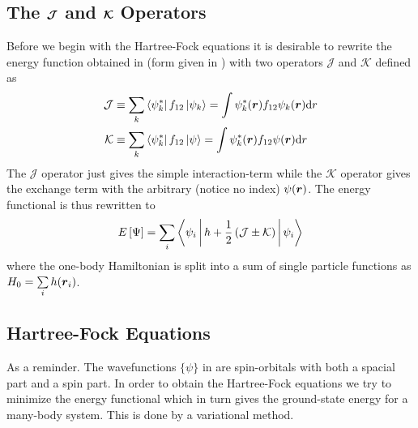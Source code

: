     \subsection{The $\boldsymbol{{\mathcal{J}}}$ and $\boldsymbol{{\mathcal{K}}}$ Operators}
        Before we begin with the Hartree-Fock equations it is desirable to
        rewrite the energy function obtained in  (form
        given in ) with two operators $\mathcal{J}$ and
        $\mathcal{K}$ defined as
            \begin{equation}
                \begin{aligned}
                    \mathcal{J} &\equiv \sum_k
                    \bra{\psi^{*}_k}f_{12}\ket{\psi_k} = \int
                    \psi^{*}_k(\boldsymbol{{r}})f_{12}\psi_k(\boldsymbol{{r}})\mathrm{d} r \\
                    \mathcal{K} &\equiv \sum_k
                    \bra{\psi^{*}_k}f_{12}\ket{\psi} = \int
                    \psi^{*}_k(\boldsymbol{{r}})f_{12}\psi(\boldsymbol{{r}})\mathrm{d} r \\
                \end{aligned}
            \end{equation}
        The $\mathcal{J}$ operator just gives the simple interaction-term while
        the $\mathcal{K}$ operator gives the exchange term with the arbitrary
        (notice no index) $\psi(\boldsymbol{{r}})$. The energy functional is thus
        rewritten to
            \begin{equation}
                E\left[\Psi\right] = \sum_i\Braket{\psi_i | h +
                \frac{1}{2}\left(\mathcal{J} \pm \mathcal{K}\right) | \psi_i}
                \label{eq:JKEfunc}
            \end{equation}
        where the one-body Hamiltonian is split into a sum of single particle
        functions as $H_0 = \sum\limits_i h(\boldsymbol{{r}}_i)$.

    \subsection{Hartree-Fock Equations}
        As a reminder. The wavefunctions $\{\psi\}$ in  are
        spin-orbitals with both a spacial part and a spin part. In order to
        obtain the Hartree-Fock equations we try to minimize the energy
        functional which in turn gives the ground-state energy for a many-body
        system. This is done by a variational method.

